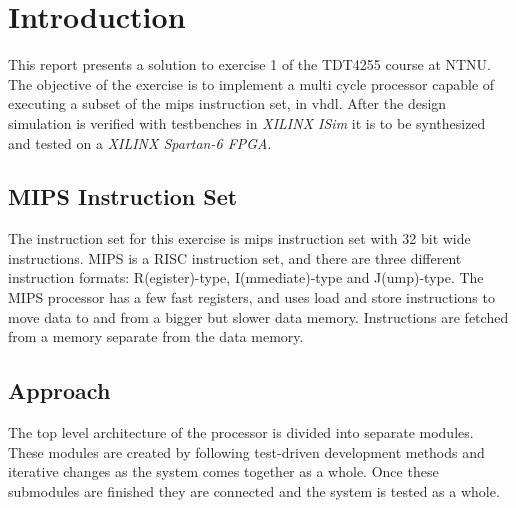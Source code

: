 \chapter{Introduction}
This report presents a solution to exercise 1 of the TDT4255 course at NTNU.
The objective of the exercise is to implement a multi cycle processor capable of executing a subset of the \gls{mips} instruction set, in \gls{vhdl}.
After the design simulation is verified with testbenches in \textit{XILINX ISim} it is to be synthesized and tested on a \textit{XILINX Spartan-6 FPGA}.

\section{MIPS Instruction Set}
The instruction set for this exercise is \gls{mips} instruction set with 32 bit wide instructions.
MIPS is a RISC instruction set,
and there are three different instruction formats: R(egister)-type, I(mmediate)-type and J(ump)-type.
The MIPS processor has a few fast registers,
and uses load and store instructions to move data to and from a bigger but slower data memory.
Instructions are fetched from a memory separate from the data memory.

\section{Approach}
The top level architecture of the processor is divided into separate modules.
These modules are created by following test-driven development methods and iterative changes as the system comes together as a whole.
Once these submodules are finished they are connected and the system is tested as a whole.

